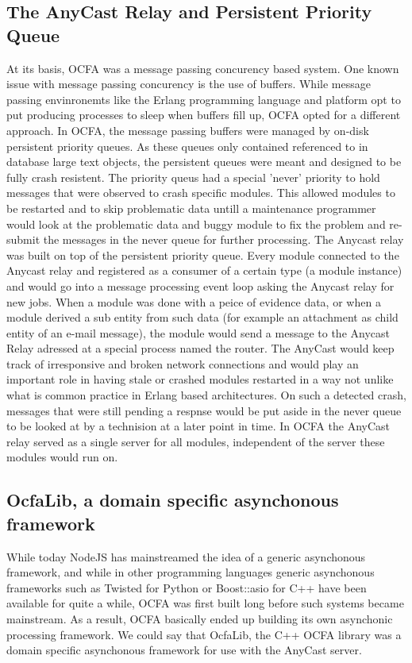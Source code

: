 \subsection{The AnyCast Relay and Persistent Priority Queue}
At its basis, OCFA was a message passing concurency based system. One known issue with message passing concurency is the use of buffers. While message passing envinronemts like the Erlang programming language and platform opt to put producing processes to sleep when buffers fill up, OCFA opted for a different approach. In OCFA, the message passing buffers were managed by on-disk persistent priority queues. As these queues only contained referenced to in database large text objects, the persistent queues were meant and designed to be fully crash resistent. The priority queus had a special 'never' priority to hold messages that were observed to crash specific modules. This allowed modules to be restarted and to skip problematic data untill a maintenance programmer would look at the problematic data and buggy module to fix the problem and re-submit the messages in the never queue for further processing. The Anycast relay was built on top of the persistent priority queue. Every module connected to the Anycast relay and registered as a consumer of a certain type (a module instance) and would go into a message processing event loop asking the Anycast relay for new jobs. When a module was done with a peice of evidence data, or when a module derived a sub entity from such data (for example an attachment as child entity of an e-mail message), the module would send a message to the Anycast Relay adressed at a special process named the router. The AnyCast would keep track of irresponsive and broken network connections and would play an important role in having stale or crashed modules restarted in a way not unlike what is common practice in Erlang based architectures. On such a detected crash, messages that were still pending a respnse would be put aside in the never queue to be looked at by a technision at a later point in time. In OCFA the AnyCast relay served as a single server for all modules, independent of the server these modules would run on.
\subsection{OcfaLib, a domain specific asynchonous framework}
While today NodeJS has mainstreamed the idea of a generic asynchonous framework, and while in other programming languages generic asynchonous frameworks such as Twisted for Python or Boost::asio for C++ have been available for quite a while, OCFA was first built long before such systems became mainstream. As a result, OCFA basically ended up building its own asynchonic processing framework. We could say that OcfaLib, the C++ OCFA library was a domain specific asynchonous framework for use with the AnyCast server. 
